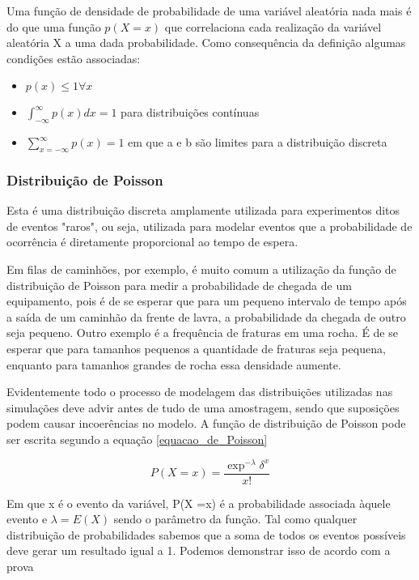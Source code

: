 Uma função de densidade de probabilidade de uma variável aleatória nada mais é do que uma função $p(X = x)$ que correlaciona cada realização da variável aleatória X a uma dada probabilidade. Como consequência da definição algumas condições estão associadas:

\begin{itemize}
	\item $p(x) \leq 1 \forall x$
	\item $\int_{-\infty}^{\infty} p(x) dx = 1$ para distribuições contínuas
	\item $\sum_{x=-\infty}^{\infty} p(x) = 1$ em que a e b são limites para a distribuição discreta
\end{itemize}
 

\subsubsection{Distribuição de Poisson}

Esta é uma distribuição discreta amplamente utilizada para experimentos ditos de eventos "raros", ou seja, utilizada para modelar eventos que a probabilidade de ocorrência é diretamente proporcional ao tempo de espera. 

Em filas de caminhões, por exemplo, é muito comum a utilização da função de distribuição de Poisson para medir a probabilidade de chegada de um equipamento, pois é de se esperar que para um pequeno intervalo de tempo após a saída de um caminhão da frente de lavra, a probabilidade da chegada de outro  seja pequeno. Outro exemplo é a frequência de fraturas em uma rocha. É de se esperar que para tamanhos pequenos a quantidade de fraturas seja pequena, enquanto para tamanhos grandes de rocha essa densidade aumente.

 Evidentemente todo o processo de modelagem das distribuições utilizadas nas simulações deve advir antes de tudo de uma amostragem, sendo que suposições podem causar incoerências no modelo. A função de distribuição de Poisson pode ser escrita segundo a equação \eqref{equacao_de_Poisson}

\begin{equation}\label{equacao_de_Poisson}
P(X = x) = \frac{\exp^{-\lambda}\delta^{x}}{x!}
\end{equation}

Em que x é o evento da variável, P(X =x) é a probabilidade associada àquele evento e $\lambda = E(X)$ sendo o parâmetro da função. Tal como qualquer distribuição de probabilidades sabemos que a soma de todos os eventos possíveis deve gerar um resultado igual a 1. Podemos demonstrar isso de acordo com a prova 

